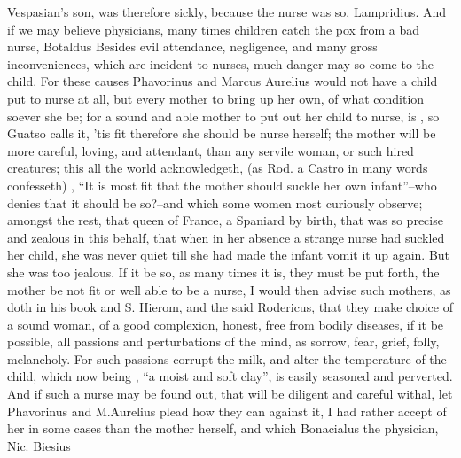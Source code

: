 Vespasian's son, was therefore sickly, because the nurse was so, Lampridius.
And if we may believe physicians, many times children catch the pox from a bad
nurse, Botaldus  Besides evil
attendance, negligence, and many gross inconveniences, which are incident to
nurses, much danger may so come to the child. For these
causes \Aristotle{}  Phavorinus and
Marcus Aurelius would not have a child put to nurse at all, but every mother to
bring up her own, of what condition soever she be; for a sound and able mother
to put out her child to nurse, is , so
Guatso calls it, 'tis fit therefore she should be nurse
herself; the mother will be more careful, loving, and attendant, than any
servile woman, or such hired creatures; this all the world acknowledgeth,
 (as Rod. a Castro  in many words confesseth) , \enquote{It is most fit that the mother should suckle her own infant}--who
denies that it should be so?--and which some women most curiously observe;
amongst the rest, that queen of France, a Spaniard by
birth, that was so precise and zealous in this behalf, that when in her absence
a strange nurse had suckled her child, she was never quiet till she had made
the infant vomit it up again. But she was too jealous. If it be so, as many
times it is, they must be put forth, the mother be not fit or well able to be a
nurse, I would then advise such mothers, as \Plutarch{} doth
in his book  and
S. Hierom,  and the said
Rodericus, that they make choice of a sound woman, of a good complexion,
honest, free from bodily diseases, if it be possible, all passions and
perturbations of the mind, as sorrow, fear, grief, folly,
melancholy. For such passions corrupt the milk, and alter the temperature of
the child, which now being , \enquote{a
moist and soft clay}, is easily seasoned and perverted. And if such a nurse may
be found out, that will be diligent and careful withal, let Phavorinus and M.Aurelius plead how they can against it, I had rather accept of her in some
cases than the mother herself, and which Bonacialus the physician, Nic. Biesius
